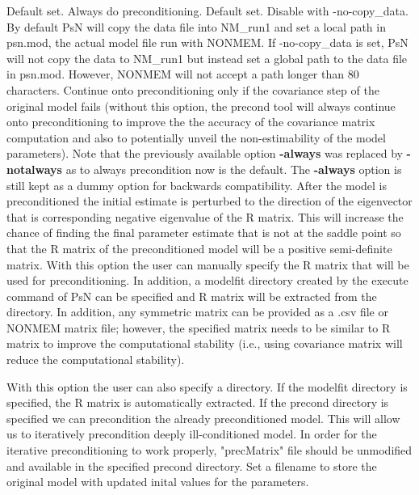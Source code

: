 \begin{optionlist}
Default set. Always do preconditioning.
\nextopt	
{}
Default set. Disable with -no-copy\_data. By default PsN will copy the data file into NM\_run1 and set a local path in psn.mod, the actual model file run with NONMEM. If -no-copy\_data is set, PsN will not copy the data to NM\_run1 but instead set a global path to the data file in psn.mod. However, NONMEM will not accept a path longer than 80 characters.
\nextopt
{}
Continue onto preconditioning only if the covariance step of the original model fails (without this option, the precond tool will always continue onto preconditioning to improve the the accuracy of the covariance matrix computation and also to potentially unveil the non-estimability of the model parameters). Note that the previously available option {\bf -always} was replaced by {\bf -notalways} as to always precondition now is the default. The {\bf -always} option is still kept as a dummy option for backwards compatibility.
\nextopt
{}
After the model is preconditioned the initial estimate is perturbed to the direction of the eigenvector that is corresponding negative eigenvalue of the R matrix.  This will increase the chance of finding the final parameter estimate that is not at the saddle point so that the R matrix of the preconditioned model will be a positive semi-definite matrix.
\nextopt
{}
With this option the user can manually specify the R matrix that will be used for preconditioning. In addition, a modelfit directory created by the execute command of PsN can be specified and R matrix will be extracted from the directory.  In addition, any symmetric matrix can be provided as a .csv file or NONMEM matrix file; however, the specified matrix needs to be similar to R matrix to improve the computational stability (i.e., using covariance matrix will reduce the computational stability).

With this option the user can also specify a directory. If the modelfit directory is specified, the R matrix is automatically extracted.  If the precond directory is specified we can precondition the already preconditioned model. This will allow us to iteratively precondition deeply ill-conditioned model. In order for the iterative preconditioning to work properly, "precMatrix" file should be unmodified and available in the specified precond directory.
\nextopt
{}
Set a filename to store the original model with updated inital values for the parameters.	
\nextopt

\end{optionlist}

